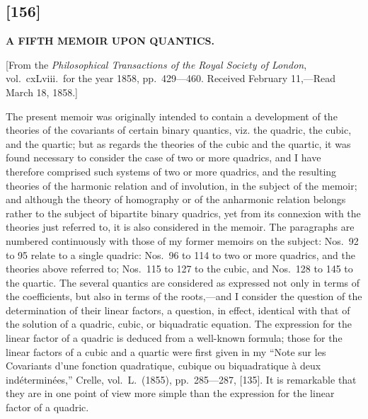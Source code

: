\documentclass[11pt,a4paper]{book}
\begin{document}
\begin{center}
\newpage
\section*{[156]}

\begin{center}
\Large\textbf{A FIFTH MEMOIR UPON QUANTICS.}
\end{center}

\begin{center}
\small[From the \textit{Philosophical Transactions of the Royal Society of London}, vol.~cxLviii.\ for the year 1858, pp.~429---460. Received February 11,---Read March 18, 1858.]
\end{center}

The present memoir was originally intended to contain a development of the theories of the covariants of certain binary quantics, viz. the quadric, the cubic, and the quartic; but as regards the theories of the cubic and the quartic, it was found necessary to consider the case of two or more quadrics, and I have therefore comprised such systems of two or more quadrics, and the resulting theories of the harmonic relation and of involution, in the subject of the memoir; and although the theory of homography or of the anharmonic relation belongs rather to the subject of bipartite binary quadrics, yet from its connexion with the theories just referred to, it is also considered in the memoir. The paragraphs are numbered continuously with those of my former memoirs on the subject: Nos.~92 to 95 relate to a single quadric: Nos.~96 to 114 to two or more quadrics, and the theories above referred to; Nos.~115 to 127 to the cubic, and Nos.~128 to 145 to the quartic. The several quantics are considered as expressed not only in terms of the coefficients, but also in terms of the roots,---and I consider the question of the determination of their linear factors, a question, in effect, identical with that of the solution of a quadric, cubic, or biquadratic equation. The expression for the linear factor of a quadric is deduced from a well-known formula; those for the linear factors of a cubic and a quartic were first given in my ``Note sur les Covariants d'une fonction quadratique, cubique ou biquadratique \`a deux ind\'etermin\'ees,'' Crelle, vol.~L.~(1855), pp.~285---287, [135]. It is remarkable that they are in one point of view more simple than the expression for the linear factor of a quadric.


\end{center}
\end{document}

